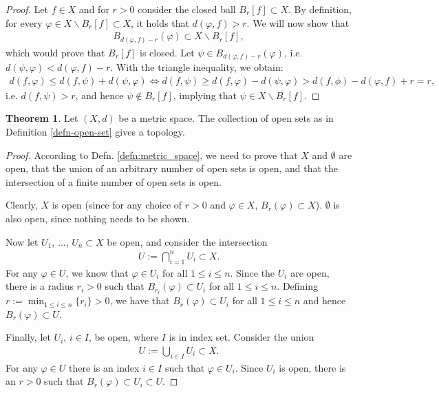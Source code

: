 \documentclass[12pt, a4paper]{article}
\numberwithin{equation}{section}
\theoremstyle{definition}
\theoremstyle{definition}
\newtheorem{theorem}[thm]{Theorem}
\begin{document}
	\begin{proof}
		Let $f\in X$ and for $r > 0$ consider the closed ball $B_{r}[f]\subset X$. By definition, for every $\varphi \in X\backslash B_{r}[f]\subset X$, it holds that $d(\varphi, f) > r$. We will now show that 
		\begin{align}
			B_{d(\varphi, f) - r}(\varphi) \subset X \backslash B_{r}[f],
		\end{align}
		which would prove that $B_{r}[f]$ is closed. Let $\psi\in B_{d(\varphi, f) - r}(\varphi)$, i.e. $d(\psi, \varphi) < d(\varphi, f) -r$. With the triangle inequality, we obtain:
		\begin{align}
			d(f, \varphi) \leq d(f, \psi) + d(\psi, \varphi) \Leftrightarrow d(f, \psi) \geq d(f, \varphi) - d(\psi, \varphi) > d(f, \phi) - d(\varphi, f) + r = r, 
		\end{align}
		i.e. $d(f, \psi) > r$, and hence $\psi\notin B_r[f]$, implying that $\psi\in X\backslash B_{r}[f]$. 
	\end{proof}
	
	\begin{theorem}\label{thrm:open_sets_form_topology}
		Let $(X, d)$ be a metric space. The collection of open sets as in Definition \ref{defn-open-set} gives a topology.
	\end{theorem}
	\begin{proof}		
		According to Defn. \ref{defn:metric_space}, we need to prove that $X$ and $\emptyset$ are open, that the union of an arbitrary number of open sets is open, and that the intersection of a finite number of open sets is open. 
		
		Clearly, $X$ is open (since for any choice of $r > 0$ and $\varphi\in X$, $B_{r}(\varphi)\subset X$). $\emptyset$ is also open, since nothing needs to be shown.
		
		Now let $U_{1}$, $\dots$, $U_{n}\subset X$ be open, and consider the intersection
		\begin{align}
			U := \bigcap_{i=1}^{n}U_{i} \subset X.
		\end{align} 
		For any $\varphi\in U$, we know that $\varphi\in U_i$ for all $1\leq i \leq n$. Since the $U_{i}$ are open, there is a radius $r_{i} > 0$ such that $B_{r_i}(\varphi) \subset U_i$ for all $1\leq i \leq n$. Defining $r := \min_{1 \leq i \leq n}\{r_{i}\} > 0$, we have that $B_{r}(\varphi) \subset U_i$ for all $1\leq i\leq n$ and hence $B_{r}(\varphi)\subset U$.
		
		Finally, let $U_{i}$, $i\in I$, be open, where $I$ is in index set. Consider the union
		\begin{align}
			U := \bigcup_{i\in I}U_{i} \subset X.
		\end{align}
		For any $\varphi\in U$ there is an index $i\in I$ such that $\varphi\in U_i$. Since $U_i$ is open, there is an $r > 0$ such that $B_{r}(\varphi) \subset U_i \subset U$.
	\end{proof}
\end{document}
